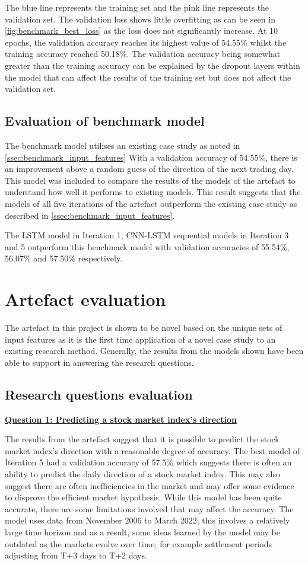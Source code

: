 The blue line represents the training set and the pink line represents
the validation set. The validation loss shows little overfitting as can be seen in
\autoref{fig:benchmark_best_loss} as the loss does not significantly increase. At 10 epochs,
the validation accuracy reaches its highest value of 54.55\% whilst the training accuracy reached 50.18\%. The validation accuracy being somewhat greater than the
training accuracy can be explained by the dropout layers within the model that can affect the results of the training
set but does not affect the validation set.


\subsection{Evaluation of benchmark model}
The benchmark model utilises an existing case study as noted in \autoref{ssec:benchmark_input_features}
With a validation accuracy of 54.55\%, there is an improvement above a random guess of the direction
of the next trading day. This model was included to compare the results of the models of the artefact to understand
how well it performs to existing models.  This result suggests that the models of all five iterations of the artefact
outperform the existing case study as described in \autoref{ssec:benchmark_input_features}.

The LSTM model in Iteration 1, CNN-LSTM sequential models in Iteration 3 and 5 outperform this benchmark model
with validation accuracies of 55.54\%, 56.07\% and 57.50\% respectively.


\section{Artefact evaluation}
The artefact in this project is shown to be novel based on the unique sets of input features as
it is the first time application of a novel case study to an existing research method. Generally,
the results from the models shown have been able to support in answering the research questions.

\subsection{Research questions evaluation}
\hyperref[predicting_direction_question]{\textbf{Question 1: Predicting a stock market index's direction}}


The results from the artefact suggest that it is possible to predict the stock market index's direction
with a reasonable degree of accuracy. The best model of Iteration 5 had a validation accuracy of 57.5\%
which suggests there is often an ability to predict the daily direction of a stock market index. This
may also suggest there are often inefficiencies in the market and may offer some evidence to disprove
the efficient market hypothesis. While this model has been quite accurate, there are some limitations
involved that may affect the accuracy. The model uses data from November 2006 to March 2022; this involves
a relatively large time horizon and as a result, some ideas learned by the model may be outdated as the markets
evolve over time; for example settlement periods adjusting from T+3 days to T+2 days.

